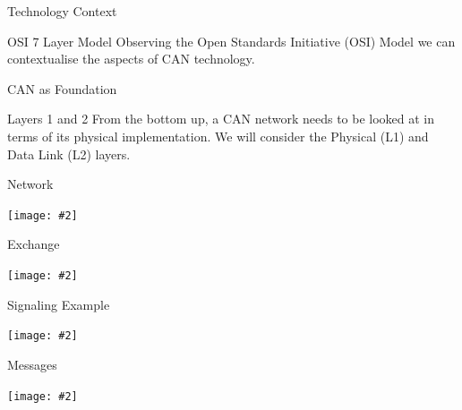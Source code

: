\documentclass{beamer}
\newcommand {\framedgraphic}[2] {
    \begin{frame}{#1}
        \begin{center}
            \texttt{[image: \#2]}
        \end{center}
    \end{frame}
}
\begin{document}
    \begin{frame}{Technology Context}
      \begin{block}{OSI 7 Layer Model}
        Observing the Open Standards Initiative (OSI) Model we can contextualise the aspects of CAN technology.
      \end{block}
      

    \end{frame}

    
    \begin{frame}{CAN as Foundation}
      \begin{block}{Layers 1 and 2}
        From the bottom up, a CAN network needs to be looked at in terms of its physical implementation. We will consider the Physical (L1) and Data Link (L2) layers.
      \end{block}
\end{frame}


    \framedgraphic{Network}{./images/generic_network}

    \framedgraphic{Exchange}{./images/can_signaling}

    \framedgraphic{Signaling Example}{./images/dso-can}
    
    \framedgraphic{Messages}{./images/CAN-Bus-frame_in_base_format_without_stuffbits}
\end{document}

